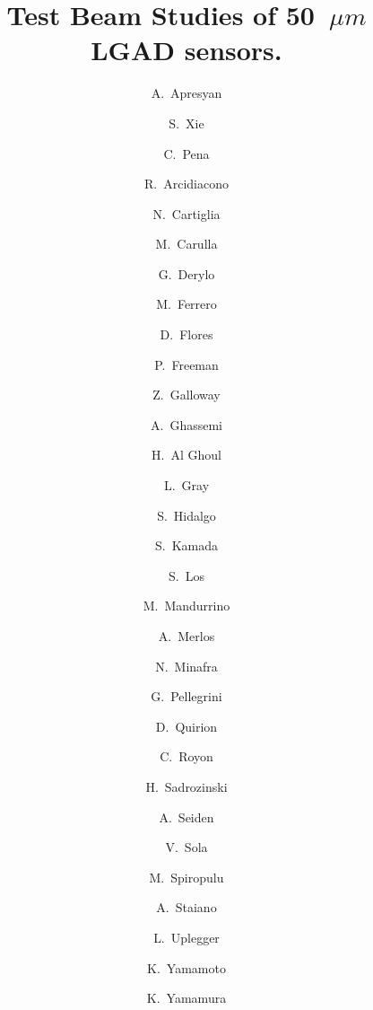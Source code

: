 \documentclass[preprint,1p]{elsarticle}
\begin{document}
\linenumbers

\begin{frontmatter}



\title{Test Beam Studies of 50~$\mu m$ LGAD sensors.}


\author[1]{A.~Apresyan}
\author[2]{S.~Xie}
\author[2]{C.~Pena}
\author[5,7]{R.~Arcidiacono}
\author[5]{N.~Cartiglia}
\author[8]{M.~Carulla}
\author[1]{G.~Derylo}
\author[5]{M.~Ferrero}
\author[8]{D.~Flores}
\author[4]{P.~Freeman}
\author[4]{Z.~Galloway}
\author[9]{A.~Ghassemi}
\author[3]{H.~Al Ghoul}
\author[1]{L.~Gray}
\author[8]{S.~Hidalgo}
\author[9]{S.~Kamada}
\author[1]{S.~Los}
\author[5]{M.~Mandurrino}
\author[8]{A.~Merlos}
\author[3]{N.~Minafra}
\author[8]{G.~Pellegrini}
\author[8]{D.~Quirion}
\author[3]{C.~Royon}
\author[4]{H.~Sadrozinski}
\author[4]{A.~Seiden}
\author[5]{V.~Sola}
\author[2]{M.~Spiropulu}
\author[5]{A.~Staiano}
\author[1]{L.~Uplegger}
\author[9]{K.~Yamamoto}
\author[9]{K.~Yamamura}

\address[1]{Fermi National Accelerator Laboratory, Batavia, IL, USA}
\address[2]{California Institute of Technology, Pasadena, CA, USA}
\address[3]{University of Kansas, KS, USA}
\address[4]{SCIPP, University of California Santa Cruz, CA, USA}
\address[5]{INFN, Torino, Italy}
\address[6]{Universit\`a di Torino, Torino, Italy}
\address[7]{Universit\`a del Piemonte Orientale, Italy}
\address[8]{Centro Nacional de Microelectr\`onica (IMB-CNM-CSIC), Barcelona, Spain}
\address[9]{Hamamatsu Photonics (HPK), Hamamatsu, Japan}


\end{frontmatter}
\end{document}

